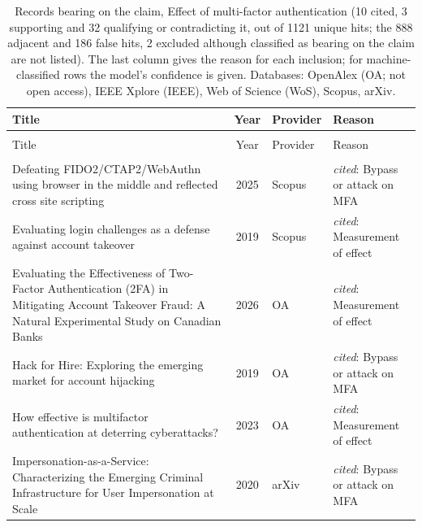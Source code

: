 
\begingroup\footnotesize
\begin{longtable}{@{}%
  >{\raggedright\arraybackslash}p{}c%
  >{\raggedright\arraybackslash}p{}%
  >{\raggedright\arraybackslash}p{}@{}}
\caption{Records bearing on the claim, Effect of multi-factor authentication (10 cited, 3 supporting and 32 qualifying or contradicting it, out of 1121 unique hits; the 888 adjacent and 186 false hits, 2 excluded although classified as bearing on the claim are not listed). The last column gives the reason for each inclusion; for machine-classified rows the model's confidence is given. Databases: OpenAlex (OA; not open access), IEEE Xplore (IEEE), Web of Science (WoS), Scopus, arXiv.}\label{tab:hits-effect}\\
\toprule
Title & Year & Provider & Reason \\
\midrule
\endfirsthead
\multicolumn{4}{@{}l}{\emph{\tablename~\thetable{} (cont.)}}\\
\toprule
Title & Year & Provider & Reason \\
\midrule
\endhead
\midrule \multicolumn{4}{r@{}}{\emph{continued on next page}}\\
\endfoot
\bottomrule
\endlastfoot
Defeating FIDO2/CTAP2/WebAuthn using browser in the middle and reflected cross site scripting & 2025 & Scopus & \emph{cited}: Bypass or attack on MFA \\
Evaluating login challenges as a defense against account takeover & 2019 & Scopus & \emph{cited}: Measurement of effect \\
Evaluating the Effectiveness of Two-Factor Authentication (2FA) in Mitigating Account Takeover Fraud: A Natural Experimental Study on Canadian Banks & 2026 & OA & \emph{cited}: Measurement of effect \\
Hack for Hire: Exploring the emerging market for account hijacking & 2019 & OA & \emph{cited}: Bypass or attack on MFA \\
How effective is multifactor authentication at deterring cyberattacks? & 2023 & OA & \emph{cited}: Measurement of effect \\
Impersonation-as-a-Service: Characterizing the Emerging Criminal Infrastructure for User Impersonation at Scale & 2020 & arXiv & \emph{cited}: Bypass or attack on MFA \\

\end{longtable}
